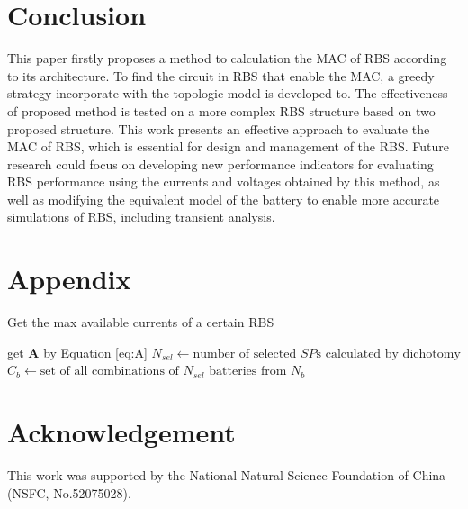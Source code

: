 \documentclass{article}
\begin{document}
\section{Conclusion}

This paper firstly proposes a method to calculation the MAC of RBS according to its architecture. 
To find the circuit in RBS that enable the MAC, a greedy strategy incorporate with the topologic model is developed to. 
The effectiveness of proposed method is tested on a more complex RBS structure based on two proposed structure.
This work presents an effective approach to evaluate the MAC of RBS, which is essential for design and management of the RBS. 
Future research could focus on developing new performance indicators for evaluating RBS performance using the currents and voltages obtained by this method, as well as modifying the equivalent model of the battery to enable more accurate simulations of RBS, including transient analysis.

\section{Appendix} 
\begin{algorithm}%
    \caption{Get the max available currents of a certain RBS}\label{alg:eta_RBS}
    \KwResult{$\max \eta$}
    get $\bm{A}$ by Equation \ref{eq:A}\;
    {
        $N_{sel} \leftarrow \text{number of selected $SP$s calculated by dichotomy}$\;
        $C_b    \leftarrow \text{set of all combinations of $N_{sel} $~batteries from $N_b$}$\;
    }
\end{algorithm}

\section{Acknowledgement}
This work was supported by the National Natural Science Foundation of China (NSFC, No.52075028).



\end{document}
